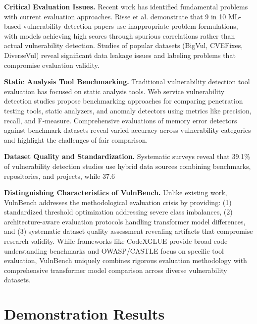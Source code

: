 \documentclass[letterpaper]{article}
\begin{document}
\textbf{Critical Evaluation Issues.} Recent work has identified fundamental problems with current evaluation approaches. Risse et al. demonstrate that 9 in 10 ML-based vulnerability detection papers use inappropriate problem formulations, with models achieving high scores through spurious correlations rather than actual vulnerability detection. Studies of popular datasets (BigVul, CVEFixes, DiverseVul) reveal significant data leakage issues and labeling problems that compromise evaluation validity.

\textbf{Static Analysis Tool Benchmarking.} Traditional vulnerability detection tool evaluation has focused on static analysis tools. Web service vulnerability detection studies propose benchmarking approaches for comparing penetration testing tools, static analyzers, and anomaly detectors using metrics like precision, recall, and F-measure. Comprehensive evaluations of memory error detectors against benchmark datasets reveal varied accuracy across vulnerability categories and highlight the challenges of fair comparison.

\textbf{Dataset Quality and Standardization.} Systematic surveys reveal that 39.1\% of vulnerability detection studies use hybrid data sources combining benchmarks, repositories, and projects, while 37.6%

\textbf{Distinguishing Characteristics of VulnBench.} Unlike existing work, VulnBench addresses the methodological evaluation crisis by providing: (1) standardized threshold optimization addressing severe class imbalances, (2) architecture-aware evaluation protocols handling transformer model differences, and (3) systematic dataset quality assessment revealing artifacts that compromise research validity. While frameworks like CodeXGLUE provide broad code understanding benchmarks and OWASP/CASTLE focus on specific tool evaluation, VulnBench uniquely combines rigorous evaluation methodology with comprehensive transformer model comparison across diverse vulnerability datasets.
\section{Demonstration Results}
\end{document}
